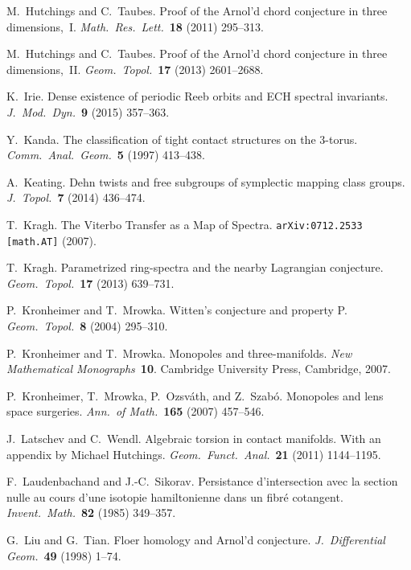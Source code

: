 \documentclass[12pt,twoside]{amsart}
\theoremstyle{plain}
\numberwithin{figure}{section}
\numberwithin{equation}{section}
\begin{document}
\begin{thebibliography}{999}
M.\ Hutchings and C.\ Taubes. 
Proof of the Arnol'd chord conjecture in three dimensions,~I. 
{\it Math.\ Res.\ Lett.}~{\bf 18} (2011) 295--313. 

M.\ Hutchings and C.\ Taubes. 
Proof of the Arnol'd chord conjecture in three dimensions,~II. 
{\it Geom.\ Topol.}~{\bf 17} (2013) 2601--2688. 

K.\ Irie.
Dense existence of periodic Reeb orbits and ECH spectral invariants. 
{\it J.\ Mod.\ Dyn.}~{\bf 9} (2015) 357--363.


Y.\ Kanda.
The classification of tight contact structures on the $3$-torus. 
{\it Comm.\ Anal.\ Geom.}~{\bf 5} (1997) 413--438.


A.\ Keating.
Dehn twists and free subgroups of symplectic mapping class groups. 
{\it J.\ Topol.}~{\bf 7} (2014) 436--474. 

T.\ Kragh. 
The Viterbo Transfer as a Map of Spectra.
{\tt arXiv:0712.2533 [math.AT]} (2007).

T.\ Kragh. 
Parametrized ring-spectra and the nearby Lagrangian conjecture. 
{\it Geom.\ Topol.}~{\bf 17} (2013) 639--731.

P.\ Kronheimer and T.\ Mrowka.
Witten's conjecture and property P. 
{\it Geom.\ Topol.}~{\bf 8} (2004) 295--310. 

P.\ Kronheimer and T.\ Mrowka.
Monopoles and three-manifolds. 
{\it New Mathematical Monographs}~{\bf 10}. 
Cambridge University Press, Cambridge, 2007. 


P.\ Kronheimer, T.\ Mrowka, P.\ Ozsv\'ath, and Z.\ Szab\'o.
Monopoles and lens space surgeries. 
{\it Ann.\ of Math.}~{\bf 165} (2007) 457--546. 

J.\ Latschev and C.\ Wendl.
Algebraic torsion in contact manifolds. 
With an appendix by Michael Hutchings.
{\it Geom.\ Funct.\ Anal.}~{\bf 21} (2011) 1144--1195. 

F.\ Laudenbachand and J.-C.\ Sikorav.
Persistance d'intersection avec la section nulle au cours d'une isotopie hamiltonienne dans un fibr\'e cotangent. 
{\it Invent.\ Math.}~{\bf 82} (1985) 349--357. 

G.\ Liu and G.\ Tian.
Floer homology and Arnol'd conjecture. 
{\it J.\ Differential Geom.}~{\bf 49} (1998) 1--74. 


\end{thebibliography}
\end{document}
